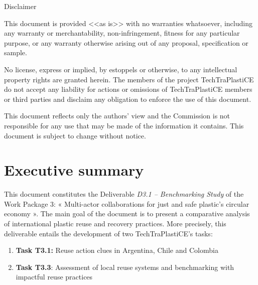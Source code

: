 \documentclass[
  12pt,
  oneside]{book}
\providecommand{\tightlist}{%
  \setlength{\itemsep}{0pt}\setlength{\parskip}{0pt}}
\renewcommand*\contentsname{Table of contents}
\newcommand\contentsname{Table of contents}
\begin{document}
\begin{frontmatter}
\begin{titlepage}
  \vfill


  

    
    
    \vfill
    
    {\scriptsize\centering\color{lightgray} 
    
    Disclaimer
    
    This document is provided <<as is>> with no warranties whatsoever, 
    including any warranty or merchantability, non-infringement, fitness for any particular 
    purpose, or any warranty otherwise arising out of any proposal, specification or sample.  
    
    No license, express or implied, by estoppels or otherwise, to any intellectual 
    property rights are granted herein. 
    The members of the project TechTraPlastiCE do not accept any liability for actions or 
    omissions of TechTraPlastiCE members or third parties and disclaim any obligation 
    to enforce the use of this document. 
    
    This document reflects only the authors' view and the Commission is not responsible 
    for any use that may be made of the information it contains.  
    This document is subject to change without notice. 
    
    }
    \normalsize
    
    
    
      \end{titlepage}
  \end{frontmatter}

\renewcommand*\contentsname{Contents}
{
\setcounter{tocdepth}{2}
\tableofcontents
}
\listoffigures
\listoftables

\mainmatter
\chapter*{Executive summary}\label{executive-summary}

This document constitutes the Deliverable \emph{D3.1 -- Benchmarking
Study} of the Work Package 3: « Multi-actor collaborations for just and
safe plastic's circular economy ». The main goal of the document is to
present a comparative analysis of international plastic reuse and
recovery practices. More precisely, this deliverable entails the
development of two TechTraPlastiCE's tasks:

\begin{enumerate}
\def\labelenumi{\arabic{enumi}.}
\tightlist
\item
  \textbf{Task T3.1:} Reuse action clues in Argentina, Chile and
  Colombia
\item
  \textbf{Task T3.3}: Assessment of local reuse systems and benchmarking
  with impactful reuse practices
\end{enumerate}
\end{document}
